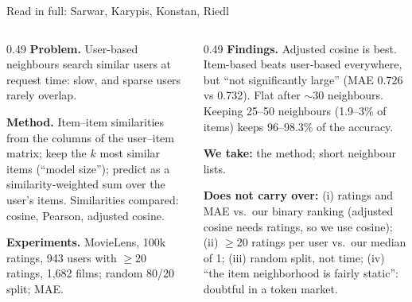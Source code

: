 \documentclass[aspectratio=169,10pt]{beamer}
\newcommand{\toindex}{\hfill\hyperlink{index}{\beamerreturnbutton{index}}}
\begin{document}
\begin{frame}[label=sarwar]{Read in full: Sarwar, Karypis, Konstan, Riedl \cite{sarwar2001} \toindex}
  \footnotesize
  \begin{columns}[T]
    \begin{column}{0.49\textwidth}
      \textbf{Problem.} User-based neighbours search similar users at request time: slow, and sparse users rarely overlap.
      \par\medskip
      \textbf{Method.} Item--item similarities from the columns of the user--item matrix; keep the $k$ most similar items (``model size''); predict as a similarity-weighted sum over the user's items. Similarities compared: cosine, Pearson, adjusted cosine.
      \par\medskip
      \textbf{Experiments.} MovieLens, 100k ratings, 943 users with $\geq$20 ratings, 1{,}682 films; random 80/20 split; MAE.
    \end{column}
    \begin{column}{0.49\textwidth}
      \textbf{Findings.} Adjusted cosine is best. Item-based beats user-based everywhere, but ``not significantly large'' (MAE 0.726 vs 0.732). Flat after $\sim$30 neighbours. Keeping 25--50 neighbours (1.9--3\% of items) keeps 96--98.3\% of the accuracy.
      \par\medskip
      {\color{teal}\textbf{We take:}} the method; short neighbour lists.
      \par\medskip
      {\color{orange}\textbf{Does not carry over:}}
      (i) ratings and MAE vs.\ our binary ranking (adjusted cosine needs ratings, so we use cosine);
      (ii) $\geq$20 ratings per user vs.\ our median of 1;
      (iii) random split, not time;
      (iv) ``the item neighborhood is fairly static'': doubtful in a token market.
    \end{column}
  \end{columns}
\end{frame}
\end{document}
